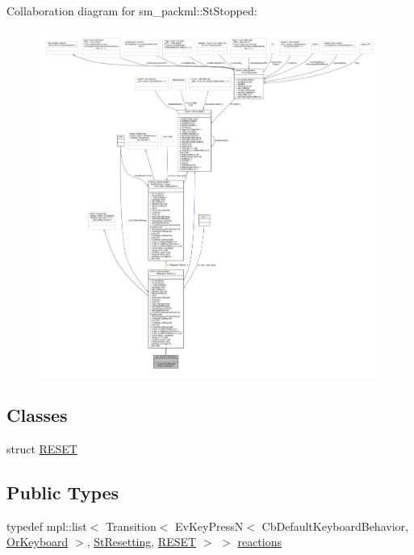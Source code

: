 Collaboration diagram for sm\+\_\+packml\+:\+:St\+Stopped\+:
\nopagebreak
\begin{figure}[H]
\begin{center}
\leavevmode
\includegraphics[width=350pt]{structsm__packml_1_1StStopped__coll__graph}
\end{center}
\end{figure}
\subsection*{Classes}
\begin{DoxyCompactItemize}
\item 
struct \hyperlink{structsm__packml_1_1StStopped_1_1RESET}{R\+E\+S\+ET}
\end{DoxyCompactItemize}
\subsection*{Public Types}
\begin{DoxyCompactItemize}
\item 
typedef mpl\+::list$<$ Transition$<$ Ev\+Key\+PressN$<$ Cb\+Default\+Keyboard\+Behavior, \hyperlink{classsm__packml_1_1OrKeyboard}{Or\+Keyboard} $>$, \hyperlink{structsm__packml_1_1StResetting}{St\+Resetting}, \hyperlink{structsm__packml_1_1StStopped_1_1RESET}{R\+E\+S\+ET} $>$ $>$ \hyperlink{structsm__packml_1_1StStopped_a367bf88fe1a8e8b373732280733d1c02}{reactions}
\end{DoxyCompactItemize}
